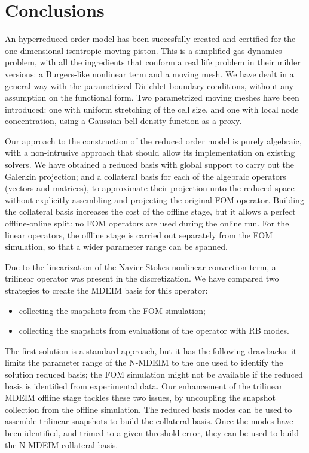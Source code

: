 \documentclass[thesis.tex]{subfiles}
\begin{document}
\section{Conclusions}
An hyperreduced order model has been succesfully created and certified for
the one-dimensional isentropic moving piston.
This is a simplified gas dynamics problem, 
with all the ingredients that conform a real life problem in their milder versions:
a Burgers-like nonlinear term and a moving mesh.
We have dealt in a general way with the parametrized Dirichlet boundary conditions,
without any assumption on the functional form.
Two parametrized moving meshes have been introduced: 
one with uniform stretching of the cell size,
and one with local node concentration, using a Gaussian bell density function as a proxy.

Our approach to the construction of the reduced order model is purely algebraic, 
with a non-intrusive approach that should allow its implementation on existing solvers.
We have obtained a reduced basis with global support to carry out the Galerkin projection;
and a collateral basis for each of the algebraic operators (vectors and matrices),
to approximate their projection unto the reduced space 
without explicitly assembling and projecting the original FOM operator.
Building the collateral basis increases the cost of the offline stage,
but it allows a perfect offline-online split:
no FOM operators are used during the online run. 
For the linear operators, the offline stage is carried out separately from the FOM simulation,
so that a wider parameter range can be spanned. 

Due to the linearization of the Navier-Stokes nonlinear convection term,
a trilinear operator was present in the discretization.
We have compared two strategies to create the MDEIM basis for this operator:
\begin{itemize}
    \item collecting the snapshots from the FOM simulation;
    \item collecting the snapshots from evaluations of the operator with RB modes.
\end{itemize}
The first solution is a standard approach, but it has the following drawbacks:
it limits the parameter range of the \mbox{N-MDEIM} to 
the one used to identify the solution reduced basis;
the FOM simulation might not be available if the reduced basis is identified
from experimental data.
Our enhancement of the trilinear MDEIM offline stage tackles these two issues,
by uncoupling the snapshot collection from the offline simulation.
The reduced basis modes can be used to assemble trilinear snapshots to build the collateral basis.
Once the modes have been identified, and trimed to a given threshold error,
they can be used to build the \mbox{N-MDEIM} collateral basis.
\end{document}
